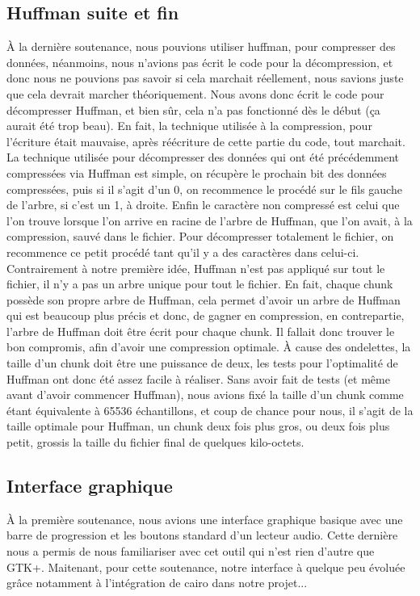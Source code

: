 \documentclass[a4paper,12pt]{article}
\begin{document}
	\subsection{Huffman suite et fin}
À la dernière soutenance, nous pouvions utiliser huffman, pour compresser des
données, néanmoins, nous n'avions pas écrit le code pour la décompression, et
donc nous ne pouvions pas savoir si cela marchait réellement, nous savions juste
que cela devrait marcher théoriquement. Nous avons donc écrit le code pour
décompresser Huffman, et bien sûr, cela n'a pas fonctionné dès le début (ça
aurait été trop beau). En fait, la technique utilisée à la compression, pour
l'écriture était mauvaise, après réécriture de cette partie du code, tout
marchait.\\
La technique utilisée pour décompresser des données qui ont été précédemment
compressées via Huffman est simple, on récupère le prochain bit des données
compressées, puis si il s'agit d'un 0, on recommence le procédé sur le fils
gauche de l'arbre, si c'est un 1, à droite. Enfin le caractère non compressé est
celui que l'on trouve lorsque l'on arrive en racine de l'arbre de Huffman, que
l'on avait, à la compression, sauvé dans le fichier. Pour décompresser
totalement le fichier, on recommence ce petit
procédé tant qu'il y a des caractères dans celui-ci.\\
Contrairement à notre première idée, Huffman n'est pas appliqué sur tout le
fichier, il n'y a pas un arbre unique pour tout le fichier. En fait, chaque
chunk possède son propre arbre de Huffman, cela permet d'avoir un arbre de
Huffman qui est beaucoup plus précis et donc, de gagner en compression, en
contrepartie, l'arbre de
Huffman doit être écrit pour chaque chunk. Il fallait donc trouver le bon
compromis, afin d'avoir une compression optimale. À cause des ondelettes, la
taille d'un chunk doit être une puissance de deux, les tests pour l'optimalité
de Huffman ont donc été assez facile à réaliser. Sans avoir fait de tests (et
même avant d'avoir commencer Huffman), nous avions fixé la taille d'un chunk
comme étant équivalente à 65536 échantillons, et coup de chance pour nous, il
s'agit de la taille optimale pour Huffman, un chunk deux fois plus gros, ou deux
fois plus petit, grossis la taille du fichier final de quelques
kilo-octets.\\

\newpage

	\subsection{Interface graphique}
À la première soutenance, nous avions une interface graphique basique avec une 
barre de progression et les boutons standard d'un lecteur audio. Cette dernière 
nous a permis de nous familiariser avec cet outil qui n'est rien d'autre que 
GTK+. Maitenant, pour cette soutenance, notre interface à quelque peu évoluée grâce 
notamment à l'intégration de cairo dans notre projet...
\end{document}
